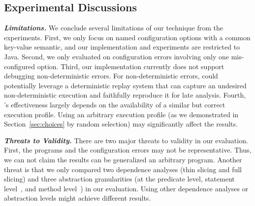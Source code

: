 \subsection{Experimental Discussions}




\noindent \textbf{\textit{Limitations.}} 
We conclude several limitations of our technique from the experiments. 
First, we only focus on named configuration options
with a common key-value semantic, and our implementation
and experiments are restricted to Java. 
Second, we only evaluated \ourtool on configuration errors
involving only one mis-configured option.
Third,  our implementation currently does not
support debugging non-deterministic errors. 
For non-deterministic errors, \ourtool could potentially leverage 
a deterministic replay system
that can capture an undesired non-deterministic
execution and faithfully reproduce it for late analysis.
Fourth, \ourtool's effectiveness  largely
depends on the availability of a similar but correct execution profile.
Using an arbitrary execution profile (as we demonstrated in Section~\ref{sec:choices}
by random selection) may significantly affect the results.

\vspace{1mm}

\noindent \textbf{\textit{Threats to Validity.}} 
There are two major threats to validity in our evaluation. 
First, the \subjectnum programs and the configuration errors may not be
representative. Thus, we can not claim the results can be
generalized an arbitrary program.
Another threat is that we only compared two dependence
analyses (thin slicing and full slicing) and three
abstraction granularities (at the predicate level,
statement level~\cite{Jones:2002}, and method level~\cite{Ernst:1999}) in our evaluation.
 Using other dependence analyses or abstraction levels
might achieve different results.

